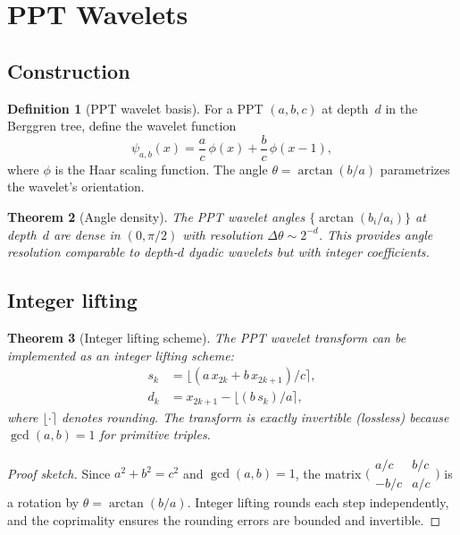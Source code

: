 \documentclass[12pt]{amsart}
\newtheorem{theorem}{Theorem}[section]
\theoremstyle{definition}
\newtheorem{definition}[theorem]{Definition}
\theoremstyle{remark}
\begin{document}
\section{PPT Wavelets}\label{sec:wavelets}

\subsection{Construction}

\begin{definition}[PPT wavelet basis]
For a PPT $(a, b, c)$ at depth~$d$ in the Berggren tree, define the
wavelet function
\[
  \psi_{a,b}(x) = \frac{a}{c}\,\phi(x) + \frac{b}{c}\,\phi(x - 1),
\]
where $\phi$ is the Haar scaling function. The angle
$\theta = \arctan(b/a)$ parametrizes the wavelet's orientation.
\end{definition}

\begin{theorem}[Angle density]\label{thm:angle-density}
The PPT wavelet angles $\{\arctan(b_i/a_i)\}$ at depth~$d$ are dense in
$(0, \pi/2)$ with resolution $\Delta\theta \sim 2^{-d}$. This provides
angle resolution comparable to depth-$d$ dyadic wavelets but with integer
coefficients.
\end{theorem}

\subsection{Integer lifting}

\begin{theorem}[Integer lifting scheme]\label{thm:lifting}
The PPT wavelet transform can be implemented as an integer lifting scheme:
\begin{align*}
  s_k &= \lfloor (a\,x_{2k} + b\,x_{2k+1}) / c \rceil, \\
  d_k &= x_{2k+1} - \lfloor (b\,s_k) / a \rceil,
\end{align*}
where $\lfloor \cdot \rceil$ denotes rounding. The transform is exactly
invertible (lossless) because $\gcd(a, b) = 1$ for primitive triples.
\end{theorem}

\begin{proof}[Proof sketch]
Since $a^2 + b^2 = c^2$ and $\gcd(a, b) = 1$, the matrix
$\bigl(\begin{smallmatrix} a/c & b/c \\ -b/c & a/c \end{smallmatrix}\bigr)$
is a rotation by $\theta = \arctan(b/a)$. Integer lifting rounds each step
independently, and the coprimality ensures the rounding errors are bounded
and invertible.
\end{proof}
\end{document}
